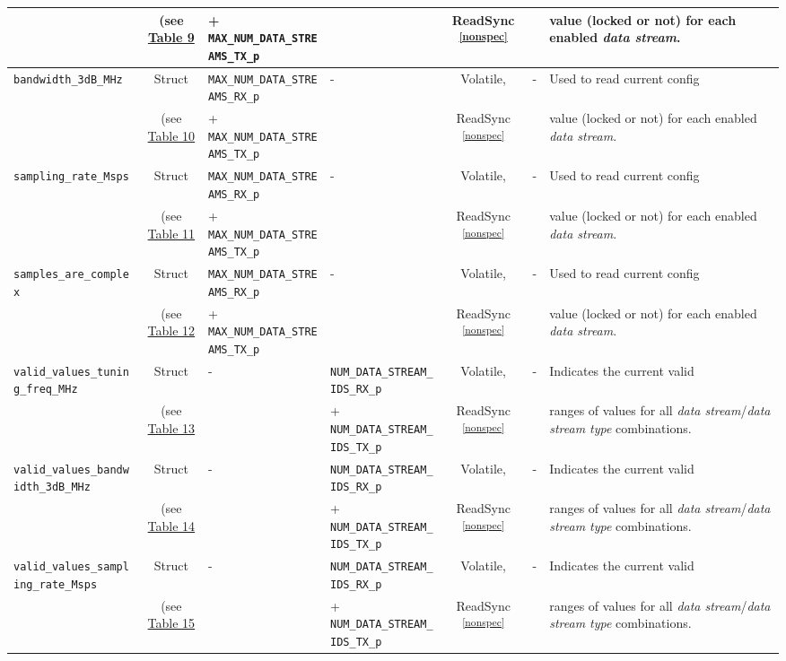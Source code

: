 \documentclass{article}
\begin{document}
\begin{landscape}
\begin{scriptsize}
\begin{longtable}{|p{5.16cm}|c|p{3.5cm}|p{3.4cm}|c|p{2.1cm}|p{3.75cm}|}
			 & (see \hyperlink{tab9}{Table 9} & + \verb+MAX_NUM_DATA_STREAMS_TX_p+ & &  ReadSync \textsuperscript{\ref{nonspec}} & & value (locked or not) for each enabled \textit{data stream}. \\
			\hline
			\verb+bandwidth_3dB_MHz+               & Struct & \verb+MAX_NUM_DATA_STREAMS_RX_p+ & - &Volatile, & -       & Used to read current config \\
			 & (see \hyperlink{tab10}{Table 10} & + \verb+MAX_NUM_DATA_STREAMS_TX_p+ & &  ReadSync \textsuperscript{\ref{nonspec}} & & value (locked or not) for each enabled \textit{data stream}. \\
			\hline
			\verb+sampling_rate_Msps+              & Struct & \verb+MAX_NUM_DATA_STREAMS_RX_p+ & - &Volatile, & -       & Used to read current config \\
			 & (see \hyperlink{tab11}{Table 11} & + \verb+MAX_NUM_DATA_STREAMS_TX_p+ & &  ReadSync \textsuperscript{\ref{nonspec}} & & value (locked or not) for each enabled \textit{data stream}. \\
			\hline
			\verb+samples_are_complex+             & Struct & \verb+MAX_NUM_DATA_STREAMS_RX_p+ & - &Volatile, & -       & Used to read current config \\
			 & (see \hyperlink{tab12}{Table 12} & + \verb+MAX_NUM_DATA_STREAMS_TX_p+ & &  ReadSync \textsuperscript{\ref{nonspec}} & & value (locked or not) for each enabled \textit{data stream}. \\
			\hline
			\verb+valid_values_tuning_freq_MHz+    & Struct & - & \verb+NUM_DATA_STREAM_IDS_RX_p+  & Volatile,   & -       & Indicates the current valid \\
			 & (see \hyperlink{tab13}{Table 13} & & + \verb+NUM_DATA_STREAM_IDS_TX_p+&  ReadSync \textsuperscript{\ref{nonspec}} & & ranges of values for all \textit{data stream}/\textit{data stream type} combinations. \\
			\hline
			\verb+valid_values_bandwidth_3dB_MHz+  & Struct & - & \verb+NUM_DATA_STREAM_IDS_RX_p+  & Volatile,   & -       & Indicates the current valid \\
			 & (see \hyperlink{tab14}{Table 14} & & + \verb+NUM_DATA_STREAM_IDS_TX_p+&  ReadSync \textsuperscript{\ref{nonspec}} & & ranges of values for all \textit{data stream}/\textit{data stream type} combinations. \\
			\hline
			\verb+valid_values_sampling_rate_Msps+ & Struct & - & \verb+NUM_DATA_STREAM_IDS_RX_p+  & Volatile,   & -       & Indicates the current valid \\
			 & (see \hyperlink{tab15}{Table 15} & & + \verb+NUM_DATA_STREAM_IDS_TX_p+&  ReadSync \textsuperscript{\ref{nonspec}} & & ranges of values for all \textit{data stream}/\textit{data stream type} combinations. \\

\end{longtable}
\end{scriptsize}
\end{landscape}
\end{document}
